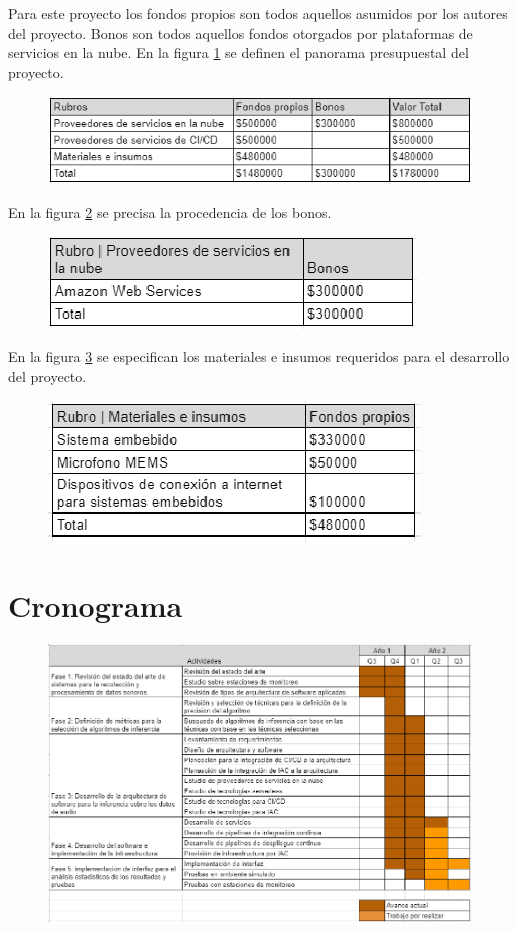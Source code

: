 Para este proyecto los fondos propios son todos aquellos asumidos por los autores del proyecto. Bonos son todos aquellos fondos otorgados por plataformas de servicios en la nube. En la figura \ref{presupuesto} se definen el panorama presupuestal del proyecto.
\begin{figure}[H]
    \centering
    \includegraphics[width=\linewidth]{secciones/Imagenes/presupuesto.eps}
    \caption{}
    \label{presupuesto}
\end{figure}
En la figura \ref{Bonos} se precisa la procedencia de los bonos.
\begin{figure}[H]
    \centering
    \includegraphics[width=\linewidth]{secciones/Imagenes/Bonos.eps}
    \caption{}
    \label{Bonos}
\end{figure}
En la figura \ref{materiales} se especifican los materiales e insumos requeridos para el desarrollo del proyecto.
\begin{figure}[H]
    \centering
    \includegraphics[width=\linewidth]{secciones/Imagenes/Materiales.eps}
    \caption{}
    \label{materiales}
\end{figure}
\newpage
\section{Cronograma}
\begin{figure}[H]
    \centering
    \includegraphics[width=\linewidth]{secciones/Imagenes/cronograma.eps}
    \caption{}
    \label{fig:my_label}
\end{figure}
\newpage